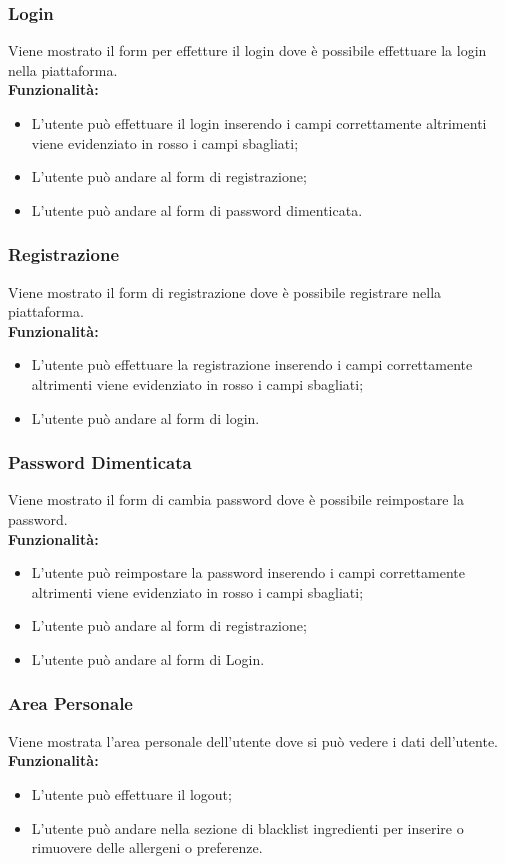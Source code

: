 \subsubsection{Login}
Viene mostrato il form per effetture il login dove è possibile effettuare la login nella piattaforma.\\
\textbf{Funzionalità:}
\begin{itemize}
    \item L'utente può effettuare il login inserendo i campi correttamente altrimenti viene evidenziato in rosso i campi sbagliati;
    \item L'utente può andare al form di registrazione;
    \item L'utente può andare al form di password dimenticata.
\end{itemize}

\subsubsection{Registrazione}
Viene mostrato il form di registrazione dove è possibile registrare nella piattaforma.\\
\textbf{Funzionalità:}
\begin{itemize}
    \item L'utente può effettuare la registrazione inserendo i campi correttamente altrimenti viene evidenziato in rosso i campi sbagliati;
    \item L'utente può andare al form di login.
\end{itemize}


\subsubsection{Password Dimenticata}
Viene mostrato il form di cambia password dove è possibile reimpostare la password.\\
\textbf{Funzionalità:}
\begin{itemize}
    \setlength\itemsep{.1em}
    \item L'utente può reimpostare la password inserendo i campi correttamente altrimenti viene evidenziato in rosso i campi sbagliati;
    \item L'utente può andare al form di registrazione;
    \item L'utente può andare al form di Login.
\end{itemize}


\subsubsection{Area Personale}
Viene mostrata l'area personale dell'utente dove si può vedere i dati dell'utente.
\textbf{Funzionalità:}
\begin{itemize}
    \item L'utente può effettuare il logout;
    \item L'utente può andare nella sezione di blacklist ingredienti per inserire o rimuovere delle allergeni o preferenze.
\end{itemize}

